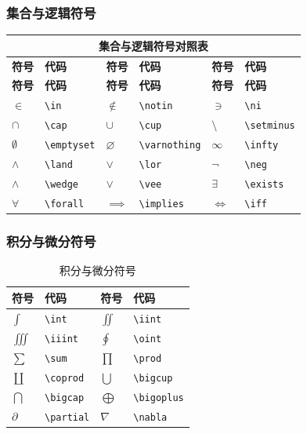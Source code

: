 \documentclass{article}
\begin{document}
\subsubsection{集合与逻辑符号}
\begin{longtable}{|p{2cm}|p{3cm}|p{2cm}|p{3cm}|p{2cm}|p{3cm}|}
\hline
\multicolumn{6}{|c|}{\textbf{集合与逻辑符号对照表}} \\
\hline
\textbf{符号} & \textbf{代码} & \textbf{符号} & \textbf{代码} & \textbf{符号} & \textbf{代码} \\
\hline
\endfirsthead
\hline
\textbf{符号} & \textbf{代码} & \textbf{符号} & \textbf{代码} & \textbf{符号} & \textbf{代码} \\
\hline
\endhead
$\in$ & \verb|\in| & $\notin$ & \verb|\notin| & $\ni$ & \verb|\ni| \\
$\cap$ & \verb|\cap| & $\cup$ & \verb|\cup| & $\setminus$ & \verb|\setminus| \\
$\emptyset$ & \verb|\emptyset| & $\varnothing$ & \verb|\varnothing| & $\infty$ & \verb|\infty| \\
$\land$ & \verb|\land| & $\lor$ & \verb|\lor| & $\neg$ & \verb|\neg| \\
$\wedge$ & \verb|\wedge| & $\vee$ & \verb|\vee| & $\exists$ & \verb|\exists| \\
$\forall$ & \verb|\forall| & $\implies$ & \verb|\implies| & $\iff$ & \verb|\iff| \\
\hline
\end{longtable}

\subsubsection{积分与微分符号}
\begin{table}[h]
\centering
\begin{tabular}{>{\centering\arraybackslash}p{3cm}>{\centering\arraybackslash}p{4cm}>{\centering\arraybackslash}p{3cm}>{\centering\arraybackslash}p{4cm}}
\toprule
\textbf{符号} & \textbf{代码} & \textbf{符号} & \textbf{代码} \\
\midrule
$\int$ & \verb|\int| & $\iint$ & \verb|\iint| \\
$\iiint$ & \verb|\iiint| & $\oint$ & \verb|\oint| \\
$\sum$ & \verb|\sum| & $\prod$ & \verb|\prod| \\
$\coprod$ & \verb|\coprod| & $\bigcup$ & \verb|\bigcup| \\
$\bigcap$ & \verb|\bigcap| & $\bigoplus$ & \verb|\bigoplus| \\
$\partial$ & \verb|\partial| & $\nabla$ & \verb|\nabla| \\
\bottomrule
\end{tabular}
\caption{积分与微分符号}
\end{table}
\end{document}
